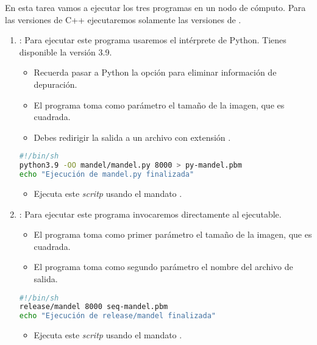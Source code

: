 En esta tarea vamos a ejecutar los tres programas en un nodo de cómputo.
Para las versiones de C++ ejecutaremos solamente las versiones de .

\begin{enumerate}
  \item {}: Para ejecutar este programa usaremos el intérprete de Python.
        Tienes disponible la versión 3.9.

    \begin{itemize}
      \item Recuerda pasar a Python la opción  para eliminar información
            de depuración.
      \item El programa toma como parámetro el tamaño de la imagen, que es cuadrada.
      \item Debes redirigir la salida a un archivo con extensión .
    \end{itemize}

\begin{lstlisting}[language=bash,title={Archivo: runpy.sh},frame=single]
#!/bin/sh
python3.9 -OO mandel/mandel.py 8000 > py-mandel.pbm
echo "Ejecución de mandel.py finalizada"
\end{lstlisting}

    \begin{itemize}
      \item Ejecuta este \emph{scritp} usando el mandato .
    \end{itemize}

  \item {}: Para ejecutar este programa invocaremos directamente al
        ejecutable.
    \begin{itemize}
      \item El programa toma como primer parámetro el tamaño de la imagen, que es cuadrada.
      \item El programa toma como segundo parámetro el nombre del archivo de salida.
    \end{itemize}

\begin{lstlisting}[language=bash,title={Archivo: run-seq-mandel.sh},frame=single]
#!/bin/sh
release/mandel 8000 seq-mandel.pbm
echo "Ejecución de release/mandel finalizada"
\end{lstlisting}
    \begin{itemize}
      \item Ejecuta este \emph{scritp} usando el mandato .
    \end{itemize}


\end{enumerate}
